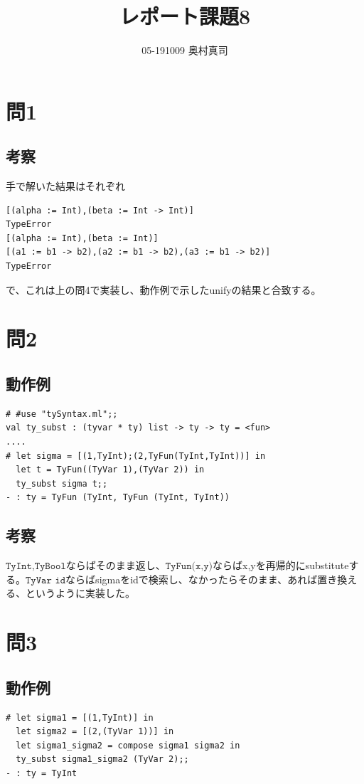 \documentclass[11pt,a4paper]{jsarticle}
\title{レポート課題8}
\author{05-191009 奥村真司}
\date{}
\begin{document}
\maketitle
%
%
\section*{問1}
\subsection*{考察}
手で解いた結果はそれぞれ
\begin{lstlisting}[basicstyle=\ttfamily\footnotesize, frame=single]
[(alpha := Int),(beta := Int -> Int)]
TypeError
[(alpha := Int),(beta := Int)]
[(a1 := b1 -> b2),(a2 := b1 -> b2),(a3 := b1 -> b2)]
TypeError
\end{lstlisting}
で、これは上の問4で実装し、動作例で示したunifyの結果と合致する。
\section*{問2}
\subsection*{動作例}
\begin{lstlisting}[basicstyle=\ttfamily\footnotesize, frame=single]
# #use "tySyntax.ml";;
val ty_subst : (tyvar * ty) list -> ty -> ty = <fun>
....
# let sigma = [(1,TyInt);(2,TyFun(TyInt,TyInt))] in
  let t = TyFun((TyVar 1),(TyVar 2)) in
  ty_subst sigma t;;
- : ty = TyFun (TyInt, TyFun (TyInt, TyInt))
\end{lstlisting}
\subsection*{考察}
$\texttt{TyInt,TyBool}$ならばそのまま返し、$\texttt{TyFun(x,y)}$ならばx,yを再帰的にsubstituteする。$\texttt{TyVar id}$ならばsigmaをidで検索し、なかったらそのまま、あれば置き換える、というように実装した。
\section*{問3}
\subsection*{動作例}
\begin{lstlisting}[basicstyle=\ttfamily\footnotesize, frame=single]
# let sigma1 = [(1,TyInt)] in
  let sigma2 = [(2,(TyVar 1))] in
  let sigma1_sigma2 = compose sigma1 sigma2 in
  ty_subst sigma1_sigma2 (TyVar 2);;
- : ty = TyInt
\end{lstlisting}
\end{document}
